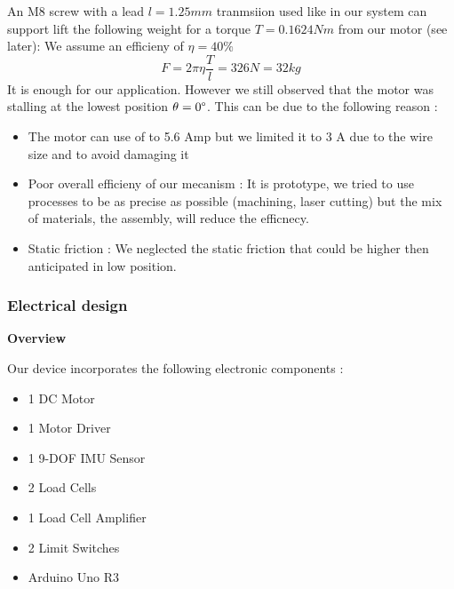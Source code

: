 \documentclass[lettersize,journal]{IEEEtran}
\begin{document}
An M8 screw with a lead $l = 1.25mm$ tranmsiion  used like in our system can support lift the following weight for a torque $T = 0.1624 Nm$ from our motor (see later): We assume an efficieny of $\eta = 40\%$
\begin{equation*}
    F =2\pi  \eta  \frac{ T}{l} = 326 N = 32 kg 
\end{equation*}
It is enough for our application. However we still observed that the motor was stalling at the lowest position $\theta = 0\degree$. This can be due to the following reason : 
\begin{itemize}
    \item The motor can use of to 5.6 Amp but we limited it to 3 A due to the wire size and to avoid damaging it 
    \item Poor overall efficieny of our mecanism : It is prototype, we tried to use processes to be as precise as possible (machining, laser cutting) but the mix of materials, the assembly, will reduce the efficnecy.
    \item Static friction : We neglected the static friction that could be higher then anticipated in low position. 
    
\end{itemize}



\bigskip

\subsubsection{Electrical design } \textcolor{green}{}

\medskip

\noindent \textbf{Overview}

\medskip

Our device incorporates the following electronic components :

\begin{itemize}
    \item 1 DC Motor

    \item 1 Motor Driver

    \item 1 9-DOF IMU Sensor

    \item 2 Load Cells

    \item 1 Load Cell Amplifier

    \item 2 Limit Switches

    \item Arduino Uno R3
\end{itemize}
\end{document}
